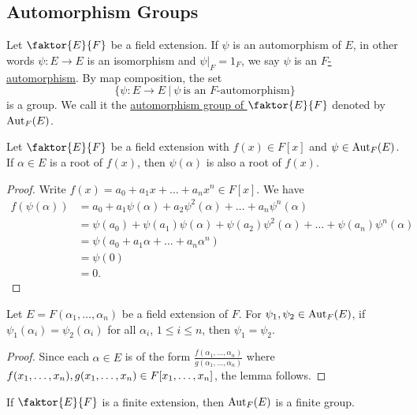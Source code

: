 \documentclass[11pt]{article}
\newcommand{\quotient}[2]{\faktor{#1}{#2}}
\begin{document}
\subsection{Automorphism Groups}
\begin{definition}
Let $\quotient{E}{F}$ be a field extension. If $\psi$ is an automorphism of $E$,
in other words $\psi: E \to E$ is an isomorphism and $\psi|_F = 1_F$, we say
$\psi$ is an \underline{$F$-automorphism}. By map composition, the set
\begin{equation*}
\{\psi:E\to E\>|\>\psi\>\text{is an }F\text{-automorphism}\}
\end{equation*}
is a group. We call it the \underline{automorphism group of $\quotient{E}{F}$}
denoted by $\operatorname{Aut}_F(E)$.
\end{definition}
\begin{lemma}
Let $\quotient{E}{F}$ be a field extension with $f(x) \in F[x]$ and $\psi \in
\operatorname{Aut}_F(E)$. If $\alpha \in E$ is a root of $f(x)$, then $\psi(\alpha)$ is also a
root of $f(x)$.
\label{lemma40}
\end{lemma}
\begin{proof}
Write $f(x) = a_0 + a_1x + \dots + a_nx^n \in F[x]$. We have
\begin{align*}
f(\psi(\alpha)) &= a_0 + a_1\psi(\alpha) + a_2\psi^2(\alpha) + \dots +
a_n\psi^n(\alpha)\\
&= \psi(a_0) + \psi(a_1)\psi(\alpha) + \psi(a_2)\psi^2(\alpha) + \dots +
\psi(a_n)\psi^n(\alpha)\\ 
&= \psi(a_0 + a_1\alpha + \dots + a_n\alpha^n)\\ 
&= \psi(0)\\ &= 0.
\end{align*}
\end{proof}
\begin{lemma}
Let $E = F(\alpha_1, \dots, \alpha_n)$ be a field extension of $F$. For
$\psi_1,\psi_2 \in \operatorname{Aut}_F(E)$, if $\psi_1(\alpha_i) = \psi_2(\alpha_i)$ for all
$\alpha_i$, $1 \leq i \leq n$, then $\psi_1 = \psi_2$.
\label{lemma41}
\end{lemma}
\begin{proof}
Since each $\alpha \in E$ is of the form $\displaystyle \frac{f(\alpha_1, \dots,
\alpha_n)}{g(\alpha_1, \dots, \alpha_n)}$ where $f(x_1, \dots, x_n), g(x_1,
\dots, x_n)\in\\ F[x_1, \dots, x_n]$, the lemma follows.
\end{proof}
\begin{corollary}
If $\quotient{E}{F}$ is a finite extension, then $\operatorname{Aut}_F(E)$ is a finite group.
\label{corollary42}
\end{corollary}
\end{document}
